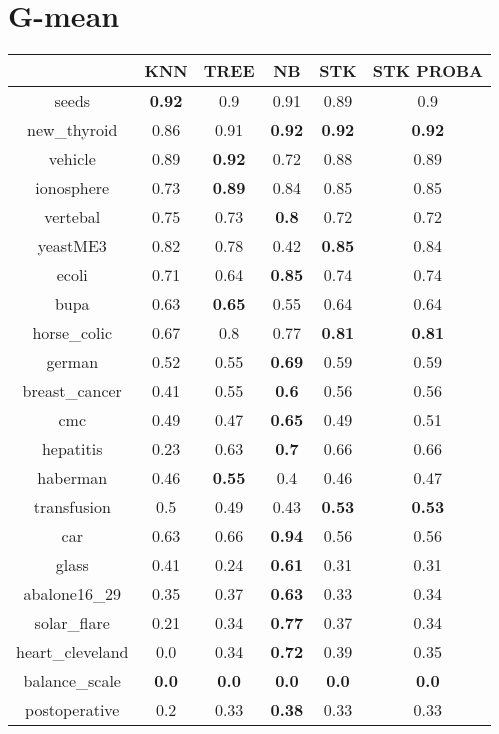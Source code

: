 \documentclass{article}%
\begin{document}
\section*{G{-}mean}%
\begin{tabular}{c|ccccc}%
&KNN&TREE&NB&STK&STK PROBA\\%
\hline%
seeds&\textbf{0.92}&0.9&0.91&0.89&0.9\\%
new\_thyroid&0.86&0.91&\textbf{0.92}&\textbf{0.92}&\textbf{0.92}\\%
vehicle&0.89&\textbf{0.92}&0.72&0.88&0.89\\%
ionosphere&0.73&\textbf{0.89}&0.84&0.85&0.85\\%
vertebal&0.75&0.73&\textbf{0.8}&0.72&0.72\\%
yeastME3&0.82&0.78&0.42&\textbf{0.85}&0.84\\%
ecoli&0.71&0.64&\textbf{0.85}&0.74&0.74\\%
bupa&0.63&\textbf{0.65}&0.55&0.64&0.64\\%
horse\_colic&0.67&0.8&0.77&\textbf{0.81}&\textbf{0.81}\\%
german&0.52&0.55&\textbf{0.69}&0.59&0.59\\%
breast\_cancer&0.41&0.55&\textbf{0.6}&0.56&0.56\\%
cmc&0.49&0.47&\textbf{0.65}&0.49&0.51\\%
hepatitis&0.23&0.63&\textbf{0.7}&0.66&0.66\\%
haberman&0.46&\textbf{0.55}&0.4&0.46&0.47\\%
transfusion&0.5&0.49&0.43&\textbf{0.53}&\textbf{0.53}\\%
car&0.63&0.66&\textbf{0.94}&0.56&0.56\\%
glass&0.41&0.24&\textbf{0.61}&0.31&0.31\\%
abalone16\_29&0.35&0.37&\textbf{0.63}&0.33&0.34\\%
solar\_flare&0.21&0.34&\textbf{0.77}&0.37&0.34\\%
heart\_cleveland&0.0&0.34&\textbf{0.72}&0.39&0.35\\%
balance\_scale&\textbf{0.0}&\textbf{0.0}&\textbf{0.0}&\textbf{0.0}&\textbf{0.0}\\%
postoperative&0.2&0.33&\textbf{0.38}&0.33&0.33\\%
\end{tabular}

%
\end{document}
